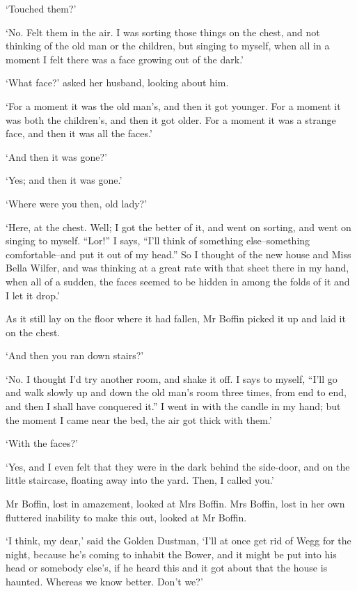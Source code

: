 ‘Touched them?’

‘No. Felt them in the air. I was sorting those things on the chest, and
not thinking of the old man or the children, but singing to myself, when
all in a moment I felt there was a face growing out of the dark.’

‘What face?’ asked her husband, looking about him.

‘For a moment it was the old man’s, and then it got younger. For a
moment it was both the children’s, and then it got older. For a moment
it was a strange face, and then it was all the faces.’

‘And then it was gone?’

‘Yes; and then it was gone.’

‘Where were you then, old lady?’

‘Here, at the chest. Well; I got the better of it, and went on sorting,
and went on singing to myself. “Lor!” I says, “I’ll think of something
else--something comfortable--and put it out of my head.” So I thought
of the new house and Miss Bella Wilfer, and was thinking at a great rate
with that sheet there in my hand, when all of a sudden, the faces seemed
to be hidden in among the folds of it and I let it drop.’

As it still lay on the floor where it had fallen, Mr Boffin picked it up
and laid it on the chest.

‘And then you ran down stairs?’

‘No. I thought I’d try another room, and shake it off. I says to myself,
“I’ll go and walk slowly up and down the old man’s room three times,
from end to end, and then I shall have conquered it.” I went in with the
candle in my hand; but the moment I came near the bed, the air got thick
with them.’

‘With the faces?’

‘Yes, and I even felt that they were in the dark behind the side-door,
and on the little staircase, floating away into the yard. Then, I called
you.’

Mr Boffin, lost in amazement, looked at Mrs Boffin. Mrs Boffin, lost in
her own fluttered inability to make this out, looked at Mr Boffin.

‘I think, my dear,’ said the Golden Dustman, ‘I’ll at once get rid of
Wegg for the night, because he’s coming to inhabit the Bower, and it
might be put into his head or somebody else’s, if he heard this and it
got about that the house is haunted. Whereas we know better. Don’t we?’

